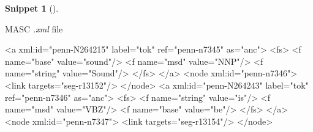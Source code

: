 \documentclass[
  letterpaper,
  krantz1]{latex/krantz-mod}
\newenvironment{Shaded}{\begin{snugshade}}{\end{snugshade}}
\newcommand{\KeywordTok}[1]{\textcolor[rgb]{0.00,0.00,0.00}{#1}}
\newcommand{\NormalTok}[1]{\textcolor[rgb]{0.00,0.00,0.00}{#1}}
\newcommand{\OtherTok}[1]{\textcolor[rgb]{0.00,0.00,0.00}{#1}}
\newcommand{\StringTok}[1]{\textcolor[rgb]{0.00,0.00,0.00}{#1}}
\theoremstyle{definition}
\theoremstyle{definition}
\newtheorem{definition}{Snippet}[chapter]
\theoremstyle{remark}
\begin{document}
\begin{definition}[]\protect\hypertarget{def-masc-xml}{}\label{def-masc-xml}

MASC \emph{.xml} file

\begin{Shaded}
\begin{Highlighting}[]
\NormalTok{\textless{}}\KeywordTok{a}\OtherTok{ xml:id=}\StringTok{"penn{-}N264215"}\OtherTok{ label=}\StringTok{"tok"}\OtherTok{ ref=}\StringTok{"penn{-}n7345"}\OtherTok{ as=}\StringTok{"anc"}\NormalTok{\textgreater{}}
\NormalTok{  \textless{}}\KeywordTok{fs}\NormalTok{\textgreater{}}
\NormalTok{    \textless{}}\KeywordTok{f}\OtherTok{ name=}\StringTok{"base"}\OtherTok{ value=}\StringTok{"sound"}\NormalTok{/\textgreater{}}
\NormalTok{    \textless{}}\KeywordTok{f}\OtherTok{ name=}\StringTok{"msd"}\OtherTok{ value=}\StringTok{"NNP"}\NormalTok{/\textgreater{}}
\NormalTok{    \textless{}}\KeywordTok{f}\OtherTok{ name=}\StringTok{"string"}\OtherTok{ value=}\StringTok{"Sound"}\NormalTok{/\textgreater{}}
\NormalTok{  \textless{}/}\KeywordTok{fs}\NormalTok{\textgreater{}}
\NormalTok{\textless{}/}\KeywordTok{a}\NormalTok{\textgreater{}}
\NormalTok{\textless{}}\KeywordTok{node}\OtherTok{ xml:id=}\StringTok{"penn{-}n7346"}\NormalTok{\textgreater{}}
\NormalTok{  \textless{}}\KeywordTok{link}\OtherTok{ targets=}\StringTok{"seg{-}r13152"}\NormalTok{/\textgreater{}}
\NormalTok{\textless{}/}\KeywordTok{node}\NormalTok{\textgreater{}}
\NormalTok{\textless{}}\KeywordTok{a}\OtherTok{ xml:id=}\StringTok{"penn{-}N264243"}\OtherTok{ label=}\StringTok{"tok"}\OtherTok{ ref=}\StringTok{"penn{-}n7346"}\OtherTok{ as=}\StringTok{"anc"}\NormalTok{\textgreater{}}
\NormalTok{  \textless{}}\KeywordTok{fs}\NormalTok{\textgreater{}}
\NormalTok{    \textless{}}\KeywordTok{f}\OtherTok{ name=}\StringTok{"string"}\OtherTok{ value=}\StringTok{"is"}\NormalTok{/\textgreater{}}
\NormalTok{    \textless{}}\KeywordTok{f}\OtherTok{ name=}\StringTok{"msd"}\OtherTok{ value=}\StringTok{"VBZ"}\NormalTok{/\textgreater{}}
\NormalTok{    \textless{}}\KeywordTok{f}\OtherTok{ name=}\StringTok{"base"}\OtherTok{ value=}\StringTok{"be"}\NormalTok{/\textgreater{}}
\NormalTok{  \textless{}/}\KeywordTok{fs}\NormalTok{\textgreater{}}
\NormalTok{\textless{}/}\KeywordTok{a}\NormalTok{\textgreater{}}
\NormalTok{\textless{}}\KeywordTok{node}\OtherTok{ xml:id=}\StringTok{"penn{-}n7347"}\NormalTok{\textgreater{}}
\NormalTok{  \textless{}}\KeywordTok{link}\OtherTok{ targets=}\StringTok{"seg{-}r13154"}\NormalTok{/\textgreater{}}
\NormalTok{\textless{}/}\KeywordTok{node}\NormalTok{\textgreater{}}
\end{Highlighting}
\end{Shaded}

\end{definition}
\end{document}
